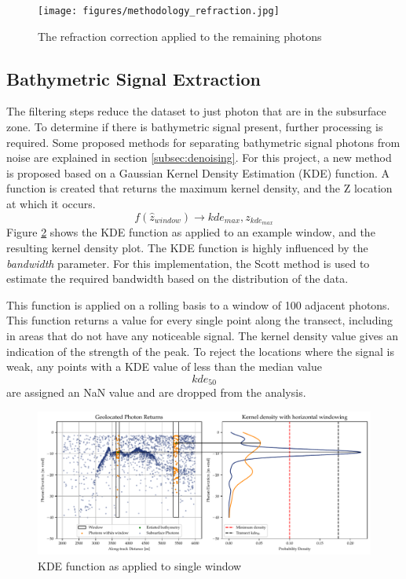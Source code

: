 \begin{figure}[htbp]
    \centering
    \texttt{[image: figures/methodology\_refraction.jpg]}
    \caption{The refraction correction applied to the remaining photons}
    \label{fig:refraction-photons}
\end{figure}

\subsection{Bathymetric Signal Extraction}\label{sec:kdesignalfinding}

The filtering steps reduce the dataset to just photon that are in the subsurface zone. To determine if there is bathymetric signal present, further processing is required. Some proposed methods for separating bathymetric signal photons from noise are explained in section \ref{subsec:denoising}. For this project, a new method is proposed based on a Gaussian Kernel Density Estimation (KDE) function. A function is created that returns the maximum kernel density, and the Z location at which it occurs. $$ f(\hat{z}_{window}) \rightarrow kde_{max},z_{kde_{max}} $$ Figure \ref{fig:kdefunc} shows the KDE function as applied to an example window, and the resulting kernel density plot. The KDE function is highly influenced by the \emph{bandwidth} parameter. For this implementation, the Scott method \parencite{Scott2015} is used to estimate the required bandwidth based on the distribution of the data. 

This function is applied on a rolling basis to a window of 100 adjacent photons. This function returns a value for every single point along the transect, including in areas that do not have any noticeable signal. The kernel density value gives an indication of the strength of the peak. To reject the locations where the signal is weak, any points with a KDE value of less than the median value $$ kde_{50} $$  are assigned an NaN value and are dropped from the analysis.

\begin{figure}[htbp]
    \centering
    \includegraphics[width=\textwidth]{figures/2d_kde_plot.pdf}
    \caption{KDE function as applied to single window}
    \label{fig:kdefunc}
\end{figure}

